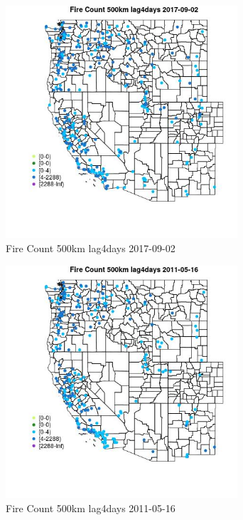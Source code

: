 \begin{figure} 
\centering  
\includegraphics[width=0.77\textwidth]{Code_Outputs/Report_ML_input_PM25_Step4_part_e_de_duplicated_aves_compiled_2019-05-20wNAs_MapObsFire_Count_500km_lag4days2017-09-02.jpg} 
\caption{\label{fig:Report_ML_input_PM25_Step4_part_e_de_duplicated_aves_compiled_2019-05-20wNAsMapObsFire_Count_500km_lag4days2017-09-02}Fire Count 500km lag4days 2017-09-02} 
\end{figure} 
 

\begin{figure} 
\centering  
\includegraphics[width=0.77\textwidth]{Code_Outputs/Report_ML_input_PM25_Step4_part_e_de_duplicated_aves_compiled_2019-05-20wNAs_MapObsFire_Count_500km_lag4days2011-05-16.jpg} 
\caption{\label{fig:Report_ML_input_PM25_Step4_part_e_de_duplicated_aves_compiled_2019-05-20wNAsMapObsFire_Count_500km_lag4days2011-05-16}Fire Count 500km lag4days 2011-05-16} 
\end{figure} 
 

